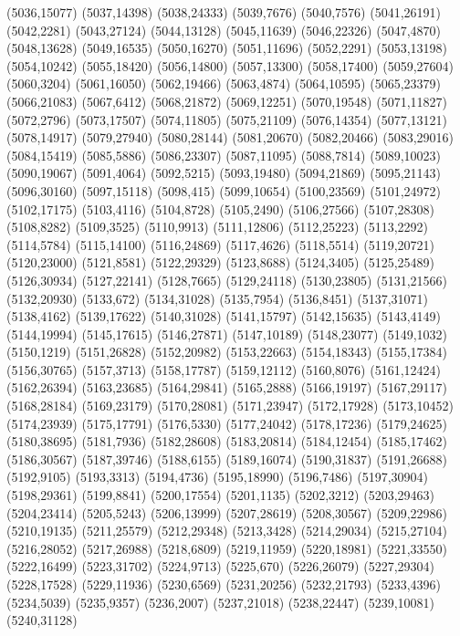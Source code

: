 (5036,15077)
(5037,14398)
(5038,24333)
(5039,7676)
(5040,7576)
(5041,26191)
(5042,2281)
(5043,27124)
(5044,13128)
(5045,11639)
(5046,22326)
(5047,4870)
(5048,13628)
(5049,16535)
(5050,16270)
(5051,11696)
(5052,2291)
(5053,13198)
(5054,10242)
(5055,18420)
(5056,14800)
(5057,13300)
(5058,17400)
(5059,27604)
(5060,3204)
(5061,16050)
(5062,19466)
(5063,4874)
(5064,10595)
(5065,23379)
(5066,21083)
(5067,6412)
(5068,21872)
(5069,12251)
(5070,19548)
(5071,11827)
(5072,2796)
(5073,17507)
(5074,11805)
(5075,21109)
(5076,14354)
(5077,13121)
(5078,14917)
(5079,27940)
(5080,28144)
(5081,20670)
(5082,20466)
(5083,29016)
(5084,15419)
(5085,5886)
(5086,23307)
(5087,11095)
(5088,7814)
(5089,10023)
(5090,19067)
(5091,4064)
(5092,5215)
(5093,19480)
(5094,21869)
(5095,21143)
(5096,30160)
(5097,15118)
(5098,415)
(5099,10654)
(5100,23569)
(5101,24972)
(5102,17175)
(5103,4116)
(5104,8728)
(5105,2490)
(5106,27566)
(5107,28308)
(5108,8282)
(5109,3525)
(5110,9913)
(5111,12806)
(5112,25223)
(5113,2292)
(5114,5784)
(5115,14100)
(5116,24869)
(5117,4626)
(5118,5514)
(5119,20721)
(5120,23000)
(5121,8581)
(5122,29329)
(5123,8688)
(5124,3405)
(5125,25489)
(5126,30934)
(5127,22141)
(5128,7665)
(5129,24118)
(5130,23805)
(5131,21566)
(5132,20930)
(5133,672)
(5134,31028)
(5135,7954)
(5136,8451)
(5137,31071)
(5138,4162)
(5139,17622)
(5140,31028)
(5141,15797)
(5142,15635)
(5143,4149)
(5144,19994)
(5145,17615)
(5146,27871)
(5147,10189)
(5148,23077)
(5149,1032)
(5150,1219)
(5151,26828)
(5152,20982)
(5153,22663)
(5154,18343)
(5155,17384)
(5156,30765)
(5157,3713)
(5158,17787)
(5159,12112)
(5160,8076)
(5161,12424)
(5162,26394)
(5163,23685)
(5164,29841)
(5165,2888)
(5166,19197)
(5167,29117)
(5168,28184)
(5169,23179)
(5170,28081)
(5171,23947)
(5172,17928)
(5173,10452)
(5174,23939)
(5175,17791)
(5176,5330)
(5177,24042)
(5178,17236)
(5179,24625)
(5180,38695)
(5181,7936)
(5182,28608)
(5183,20814)
(5184,12454)
(5185,17462)
(5186,30567)
(5187,39746)
(5188,6155)
(5189,16074)
(5190,31837)
(5191,26688)
(5192,9105)
(5193,3313)
(5194,4736)
(5195,18990)
(5196,7486)
(5197,30904)
(5198,29361)
(5199,8841)
(5200,17554)
(5201,1135)
(5202,3212)
(5203,29463)
(5204,23414)
(5205,5243)
(5206,13999)
(5207,28619)
(5208,30567)
(5209,22986)
(5210,19135)
(5211,25579)
(5212,29348)
(5213,3428)
(5214,29034)
(5215,27104)
(5216,28052)
(5217,26988)
(5218,6809)
(5219,11959)
(5220,18981)
(5221,33550)
(5222,16499)
(5223,31702)
(5224,9713)
(5225,670)
(5226,26079)
(5227,29304)
(5228,17528)
(5229,11936)
(5230,6569)
(5231,20256)
(5232,21793)
(5233,4396)
(5234,5039)
(5235,9357)
(5236,2007)
(5237,21018)
(5238,22447)
(5239,10081)
(5240,31128)
